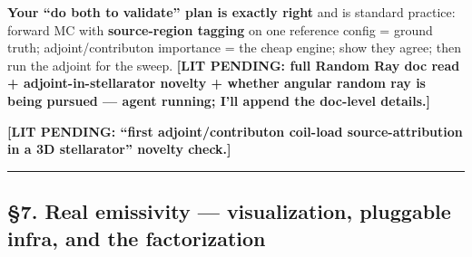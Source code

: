 \documentclass[
]{article}
\begin{document}
\textbf{Your ``do both to validate'' plan is exactly right} and is
standard practice: forward MC with \textbf{source-region tagging} on one
reference config = ground truth; adjoint/contributon importance = the
cheap engine; show they agree; then run the adjoint for the sweep.
\textbf{{[}LIT PENDING: full Random Ray doc read +
adjoint-in-stellarator novelty + whether angular random ray is being
pursued --- agent running; I'll append the doc-level details.{]}}

\textbf{{[}LIT PENDING: ``first adjoint/contributon coil-load
source-attribution in a 3D stellarator'' novelty check.{]}}

\begin{center}\rule{0.5\linewidth}{0.5pt}\end{center}

\subsection{§7. Real emissivity --- visualization, pluggable infra, and
the
factorization}\label{real-emissivity-visualization-pluggable-infra-and-the-factorization}
\end{document}
